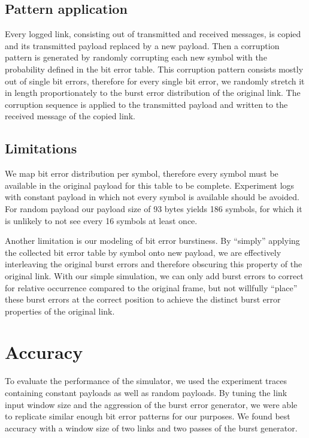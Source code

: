 \subsection{Pattern application}

Every logged link, consisting out of transmitted and received messages, is copied and its transmitted payload replaced by a new payload.
Then a corruption pattern is generated by randomly corrupting each new symbol with the probability defined in the bit error table.
This corruption pattern consists mostly out of single bit errors, therefore for every single bit error, we randomly stretch it in length proportionately to the burst error distribution of the original link.
The corruption sequence is applied to the transmitted payload and written to the received message of the copied link.

\subsection{Limitations}

We map bit error distribution per symbol, therefore every symbol must be available in the original payload for this table to be complete.
Experiment logs with constant payload in which not every symbol is available should be avoided.
For random payload our payload size of 93 bytes yields 186 symbols, for which it is unlikely to not see every 16 symbols at least once.

Another limitation is our modeling of bit error burstiness.
By ``simply'' applying the collected bit error table by symbol onto new payload, we are effectively interleaving the original burst errors and therefore obscuring this property of the original link.
With our simple simulation, we can only add burst errors to correct for relative occurrence compared to the original frame, but not willfully ``place'' these burst errors at the correct position to achieve the distinct burst error properties of the original link.


\section{Accuracy}

To evaluate the performance of the simulator, we used the experiment traces containing constant payloads as well as random payloads.
By tuning the link input window size and the aggression of the burst error generator, we were able to replicate similar enough bit error patterns for our purposes.
We found best accuracy with a window size of two links and two passes of the burst generator.

